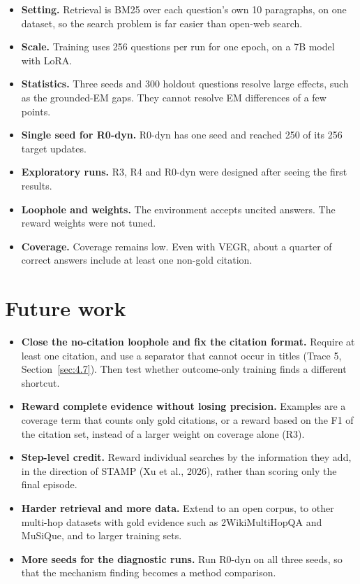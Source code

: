 \begin{itemize}
\tightlist
\item
  \textbf{Setting.} Retrieval is BM25 over each question's own 10
  paragraphs, on one dataset, so the search problem is far easier than
  open-web search.
\item
  \textbf{Scale.} Training uses 256 questions per run for one epoch, on
  a 7B model with LoRA.
\item
  \textbf{Statistics.} Three seeds and 300 holdout questions resolve
  large effects, such as the grounded-EM gaps. They cannot resolve EM
  differences of a few points.
\item
  \textbf{Single seed for R0-dyn.} R0-dyn has one seed and reached 250
  of its 256 target updates.
\item
  \textbf{Exploratory runs.} R3, R4 and R0-dyn were designed after
  seeing the first results.
\item
  \textbf{Loophole and weights.} The environment accepts uncited
  answers. The reward weights were not tuned.
\item
  \textbf{Coverage.} Coverage remains low. Even with VEGR, about a
  quarter of correct answers include at least one non-gold citation.
\end{itemize}

\section{Future work}\label{sec:5.4}

\begin{itemize}
\tightlist
\item
  \textbf{Close the no-citation loophole and fix the citation format.}
  Require at least one citation, and use a separator that cannot occur
  in titles (Trace 5, Section~\ref{sec:4.7}). Then test whether
  outcome-only training finds a different shortcut.
\item
  \textbf{Reward complete evidence without losing precision.} Examples
  are a coverage term that counts only gold citations, or a reward based
  on the F1 of the citation set, instead of a larger weight on coverage
  alone (R3).
\item
  \textbf{Step-level credit.} Reward individual searches by the
  information they add, in the direction of STAMP (Xu et al., 2026),
  rather than scoring only the final episode.
\item
  \textbf{Harder retrieval and more data.} Extend to an open corpus, to
  other multi-hop datasets with gold evidence such as 2WikiMultiHopQA
  and MuSiQue, and to larger training sets.
\item
  \textbf{More seeds for the diagnostic runs.} Run R0-dyn on all three
  seeds, so that the mechanism finding becomes a method comparison.
\end{itemize}
